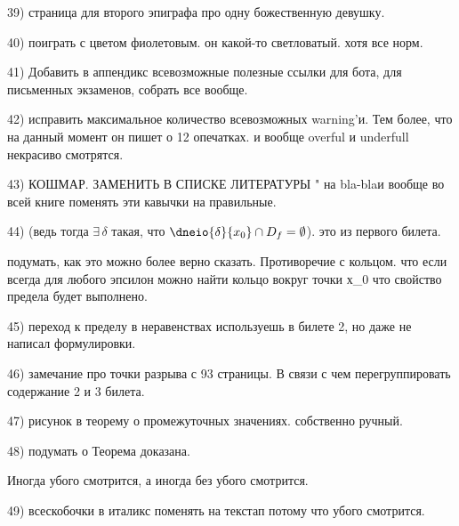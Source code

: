 39) страница для второго эпиграфа про одну божественную девушку.

40) поиграть с цветом фиолетовым. он какой-то светловатый. хотя все норм.

41) Добавить в аппендикс всевозможные полезные ссылки для бота, для письменных экзаменов, собрать все вообще.

42) исправить максимальное количество всевозможных warning'и. Тем более, что на данный момент он пишет о 12 опечатках. и вообще overful и underfull некрасиво смотрятся.

43) КОШМАР. ЗАМЕНИТЬ В СПИСКЕ ЛИТЕРАТУРЫ " на \glqq bla-bla\grqq и вообще во всей книге поменять эти кавычки на правильные.

44) (ведь тогда $\exists\, \delta$ такая, что $\dneio{\delta}{x_0}\cap D_f=\emptyset$). это из первого билета.

подумать, как это можно более верно сказать. Противоречие с кольцом. что если всегда для любого эпсилон можно найти кольцо вокруг точки х_0 что свойство предела будет выполнено.

45) переход к пределу в неравенствах используешь в билете 2, но даже не написал формулировки.

46) замечание про точки разрыва с 93 страницы. В связи с чем перегруппировать содержание 2 и 3 билета.

47) рисунок в теорему о промежуточных значениях. собственно ручный.

48) подумать о \noindent Теорема доказана. 

Иногда убого смотрится, а иногда без \noindent убого смотрится.

49) всескобочки в италикс поменять на текстап потому что убого смотрится.